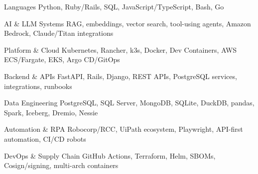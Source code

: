


\begin{cvskills}


\cvskill
{Languages} %
{Python, Ruby/Rails, SQL, JavaScript/TypeScript, Bash, Go} %


\cvskill
{AI \& LLM Systems} %
{RAG, embeddings, vector search, tool-using agents, Amazon Bedrock, Claude/Titan integrations} %


\cvskill
{Platform \& Cloud} %
{Kubernetes, Rancher, k3s, Docker, Dev Containers, AWS ECS/Fargate, EKS, Argo CD/GitOps} %


\cvskill
{Backend \& APIs} %
{FastAPI, Rails, Django, REST APIs, PostgreSQL services, integrations, runbooks} %


\cvskill
{Data Engineering} %
{PostgreSQL, SQL Server, MongoDB, SQLite, DuckDB, pandas, Spark, Iceberg, Dremio, Nessie} %


\cvskill
{Automation \& RPA} %
{Robocorp/RCC, UiPath ecosystem, Playwright, API-first automation, CI/CD robots} %


\cvskill
{DevOps \& Supply Chain} %
{GitHub Actions, Terraform, Helm, SBOMs, Cosign/signing, multi-arch containers} %


\end{cvskills}
